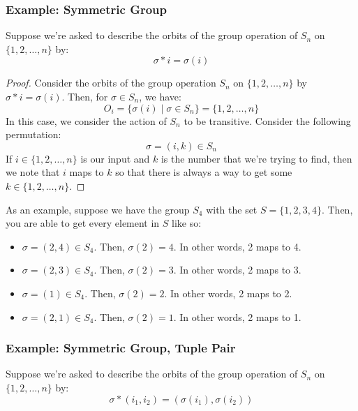 \documentclass[letterpaper]{article}
\begin{document}
\subsubsection{Example: Symmetric Group}
Suppose we're asked to describe the orbits of the group operation of $S_n$ on $\{1, 2, \dots, n\}$ by: 
\[\sigma * i = \sigma(i)\]
\begin{mdframed}
    \begin{proof}
        Consider the orbits of the group operation $S_n$ on $\{1, 2, \dots, n\}$ by $\sigma * i = \sigma(i)$. Then, for $\sigma \in S_n$, we have:  
        \[O_{i} = \{\sigma(i) \mid \sigma \in S_n\} = \{1, 2, \dots, n\}\]
        In this case, we consider the action of $S_n$ to be transitive. Consider the following permutation: 
        \[\sigma = (i, k) \in S_n\]
        If $i \in \{1, 2, \dots, n\}$ is our input and $k$ is the number that we're trying to find, then we note that $i$ maps to $k$ so that there is always a way to get some $k \in \{1, 2, \dots, n\}$. 
    \end{proof}
\end{mdframed}

As an example, suppose we have the group $S_4$ with the set $S = \{1, 2, 3, 4\}$. Then, you are able to get every element in $S$ like so: 
\begin{itemize}
    \item $\sigma = (2, 4) \in S_4$. Then, $\sigma(2) = 4$. In other words, 2 maps to 4.
    \item $\sigma = (2, 3) \in S_4$. Then, $\sigma(2) = 3$. In other words, 2 maps to 3.
    \item $\sigma = (1) \in S_4$. Then, $\sigma(2) = 2$. In other words, 2 maps to 2.
    \item $\sigma = (2, 1) \in S_4$. Then, $\sigma(2) = 1$. In other words, 2 maps to 1.
\end{itemize}

\subsubsection{Example: Symmetric Group, Tuple Pair}
Suppose we're asked to describe the orbits of the group operation of $S_n$ on $\{1, 2, \dots, n\}$ by: 
\[\sigma * (i_1, i_2) = (\sigma(i_1), \sigma(i_2))\]
\end{document}
